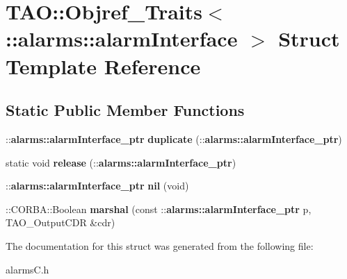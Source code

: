 \section{T\+AO\+:\+:Objref\+\_\+\+Traits$<$ \+:\+:alarms\+:\+:alarm\+Interface $>$ Struct Template Reference}
\label{structTAO_1_1Objref__Traits_3_01_1_1alarms_1_1alarmInterface_01_4}
\subsection*{Static Public Member Functions}
\begin{DoxyCompactItemize}
\item 
\+::{\bf alarms\+::alarm\+Interface\+\_\+ptr} {\bfseries duplicate} (\+::{\bf alarms\+::alarm\+Interface\+\_\+ptr})\label{structTAO_1_1Objref__Traits_3_01_1_1alarms_1_1alarmInterface_01_4_a5d78e1507dd35f2bace82904e4cde042}

\item 
static void {\bfseries release} (\+::{\bf alarms\+::alarm\+Interface\+\_\+ptr})\label{structTAO_1_1Objref__Traits_3_01_1_1alarms_1_1alarmInterface_01_4_a002c1d76d4803a232f9aea02d010baaf}

\item 
\+::{\bf alarms\+::alarm\+Interface\+\_\+ptr} {\bfseries nil} (void)\label{structTAO_1_1Objref__Traits_3_01_1_1alarms_1_1alarmInterface_01_4_a6dbd31a3f508594e3bd8daac43a4b06d}

\item 
\+::C\+O\+R\+B\+A\+::\+Boolean {\bfseries marshal} (const \+::{\bf alarms\+::alarm\+Interface\+\_\+ptr} p, T\+A\+O\+\_\+\+Output\+C\+DR \&cdr)\label{structTAO_1_1Objref__Traits_3_01_1_1alarms_1_1alarmInterface_01_4_a449680ce6c156e51d516bffe1e7527c9}

\end{DoxyCompactItemize}


The documentation for this struct was generated from the following file\+:\begin{DoxyCompactItemize}
\item 
alarms\+C.\+h\end{DoxyCompactItemize}
